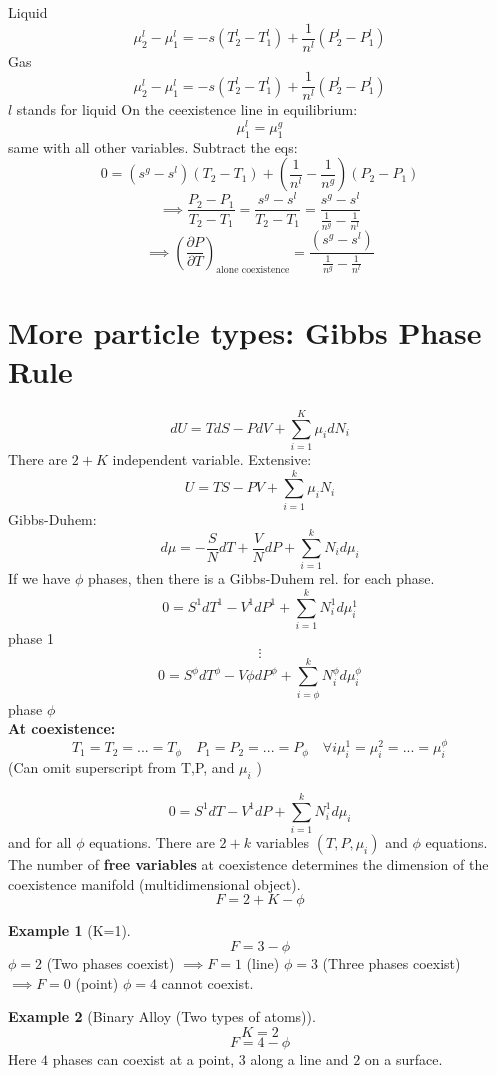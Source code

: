 \documentclass[11pt]{book}
\theoremstyle{definition}
\newtheorem{example}{Example}[section]
\begin{document}
Liquid
\[ \mu_2^{l} - \mu_1^{l} = -s(T_2^{l}-T_1^{l}) + \frac{1}{n^{l}}(P_2^{l}-P_1^{l})\] 
Gas
\[ \mu_2^{l} - \mu_1^{l} = -s(T_2^{l}-T_1^{l}) + \frac{1}{n^{l}}(P_2^{l}-P_1^{l})\] 
$ l $ stands for liquid
On the ceexistence line in equilibrium:
\[ \mu_1^{l} = \mu_1^{g} \] same with all other variables.
Subtract the eqs:
\[ 0 = (s^{g}-s^{l})(T_2 - T_1) + \left( \frac{1}{n^{l}} - \frac{1}{n^{g}} \right)(P_2-P_1)  \] 
\[ \implies \frac{P_2-P_1}{T_2-T_1} = \frac{s^{g} - s^{l}}{T_2-T_1} = \frac{s^{g}-s^{l}}{\frac{1}{n^{g}} - \frac{1}{n^{l}}} \] 
\[ \implies \left (\frac{\partial P}{\partial T} \right )_{\text{alone coexistence}} = \frac{(s^{g}-s^{l})}{ \frac{1}{n^{g}} - \frac{1}{n^{l}}}\] 


\section{More particle types: Gibbs Phase Rule}
\[ dU = TdS -PdV + \sum_{i=1}^{K} \mu_i dN_i\] 
There are $ 2+K $ independent variable.
Extensive:
\[ U = TS-PV+\sum_{i=1}^{k} \mu_i N_i \] 
Gibbs-Duhem:
\[ d\mu = -\frac{S}{N} dT + \frac{V}{N}dP + \sum_{i=1}^{k}N_i d\mu_i \] 
If we have $ \phi $ phases, then there is a Gibbs-Duhem rel. for each phase.
\[ 0 = S^{1} dT^{1} -V^{1}dP^{1} + \sum_{i=1}^{k}N_i^{1}d\mu_i^{1}\] phase 1
\[ \vdots \] 
\[ 0 = S^{\phi} dT^{\phi} -V{\phi}dP^{\phi} + \sum_{i=\phi}^{k}N_i^{\phi}d\mu_i^{\phi}\] phase $ \phi $ \\
\textbf{At coexistence:} 
\[ T_1=T_2=...=T_\phi \quad P_1=P_2=...=P_\phi \quad \forall i \mu_i^{1} = \mu_i^{2} = ... =\mu_i^{\phi}\] 
(Can omit superscript from T,P, and $ \mu_i $ )

\[ 0 = S^{1}dT - V^{1}dP + \sum_{i=1}^{k} N_i^{1} d\mu_i \] 
and for all $ \phi $ equations.
There are $ 2+k $ variables $(T,P,\mu_i)$ and $ \phi $ equations.
The number of \textbf{free variables} at coexistence determines the dimension of the coexistence manifold (multidimensional object).
\[ F = 2+K-\phi \]

\begin{example}[K=1]
	\[ F = 3 - \phi \] 
	$ \phi=2 $ (Two phases coexist) $\implies F=1$ (line)
	$ \phi=3 $ (Three phases coexist) $\implies  F=0 $ (point)
	$ \phi=4 $ cannot coexist.  
\end{example}

\begin{example}[Binary Alloy (Two types of atoms)] 
	\[ K=2 \] 
	\[ F = 4 - \phi \] 
	Here $ 4 $ phases can coexist at a point, $ 3 $ along a line and $ 2 $ on a surface.
\end{example}
\end{document}
